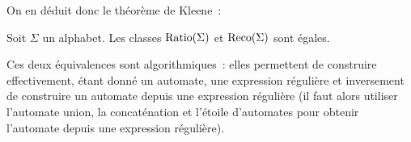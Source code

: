 On en déduit donc le théorème de Kleene~:

\begin{theorem}[Kleene]
  Soit $\Sigma$ un alphabet. Les classes $\operatorname{Ratio}(\Sigma)$ et $\operatorname{Reco}(\Sigma)$
  sont égales.
\end{theorem}

\begin{remark}
  Ces deux équivalences sont algorithmiques~: elles permettent de construire
  effectivement, étant donné un automate, une expression régulière et
  inversement de construire un automate depuis une expression régulière (il faut
  alors utiliser l'automate union, la concaténation et l'étoile d'automates pour
  obtenir l'automate depuis une expression régulière).
\end{remark}
